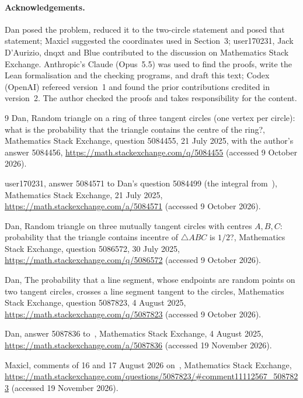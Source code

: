 \documentclass[11pt]{article}
\theoremstyle{remark}
\begin{document}
\paragraph{Acknowledgements.} Dan posed the problem, reduced it to the two-circle statement and
posed that statement; Maxicl suggested the coordinates used in Section~3; user170231,
Jack D'Aurizio, dnqxt and Blue contributed to the discussion on Mathematics Stack Exchange.
Anthropic's Claude (Opus~5.5) was used to find the proofs, write the Lean formalisation and the
checking programs, and draft this text; Codex (OpenAI) refereed version~1 and found the prior
contributions credited in version~2. The author checked the proofs and takes responsibility for
the content.

\begin{thebibliography}{9}
Dan, Random triangle on a ring of three tangent circles (one vertex per circle): what is the
probability that the triangle contains the centre of the ring?, Mathematics Stack Exchange,
question 5084455, 21 July 2025, with the author's answer 5084456,
\url{https://math.stackexchange.com/q/5084455} (accessed 9 October 2026).

user170231, answer 5084571 to Dan's question 5084499 (the integral from~\cite{DanEqual}),
Mathematics Stack Exchange, 21 July 2025,
\url{https://math.stackexchange.com/a/5084571} (accessed 9 October 2026).

Dan, Random triangle on three mutually tangent circles with centres $A,B,C$: probability that the
triangle contains incentre of $\triangle ABC$ is $1/2$?, Mathematics Stack Exchange, question
5086572, 30 July 2025, \url{https://math.stackexchange.com/q/5086572} (accessed 9 October 2026).

Dan, The probability that a line segment, whose endpoints are random points on two tangent
circles, crosses a line segment tangent to the circles, Mathematics Stack Exchange, question
5087823, 4 August 2025, \url{https://math.stackexchange.com/q/5087823} (accessed 9 October 2026).

Dan, answer 5087836 to~\cite{DanAny}, Mathematics Stack Exchange, 4 August 2025,
\url{https://math.stackexchange.com/a/5087836} (accessed 19 November 2026).

Maxicl, comments of 16 and 17 August 2026 on~\cite{DanLemma}, Mathematics Stack Exchange,
\url{https://math.stackexchange.com/questions/5087823/#comment11112567_5087823} (accessed 19 November 2026).


\end{thebibliography}
\end{document}
